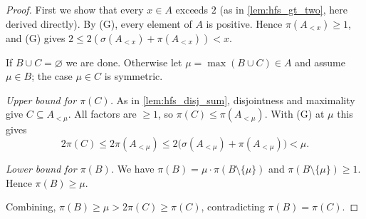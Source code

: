 \documentclass[11pt]{article}
\theoremstyle{definition}
\theoremstyle{remark}
\begin{document}
\begin{proof}
First we show that every $x\in A$ exceeds $2$ (as in \cref{lem:hfs_gt_two}, here derived directly). By (G), every element of $A$ is positive. Hence $\pi(A_{<x})\ge1$, and (G) gives $2\le2(\sigma(A_{<x})+\pi(A_{<x}))<x$.

If $B\cup C=\varnothing$ we are done. Otherwise let $\mu=\max(B\cup C)\in A$ and assume $\mu\in B$; the case $\mu\in C$ is symmetric.

\emph{Upper bound for $\pi(C)$.} As in \cref{lem:hfs_disj_sum}, disjointness and maximality give $C\subseteq A_{<\mu}$. All factors are $\ge1$, so $\pi(C)\le\pi(A_{<\mu})$. With (G) at $\mu$ this gives
\[
2\pi(C)\le2\pi(A_{<\mu})\le 2\bigl(\sigma(A_{<\mu})+\pi(A_{<\mu})\bigr)<\mu.
\]

\emph{Lower bound for $\pi(B)$.} We have $\pi(B)=\mu\cdot\pi(B\setminus\{\mu\})$ and $\pi(B\setminus\{\mu\})\ge1$. Hence $\pi(B)\ge\mu$.

Combining, $\pi(B)\ge\mu>2\pi(C)\ge\pi(C)$, contradicting $\pi(B)=\pi(C)$.
\end{proof}
\end{document}
